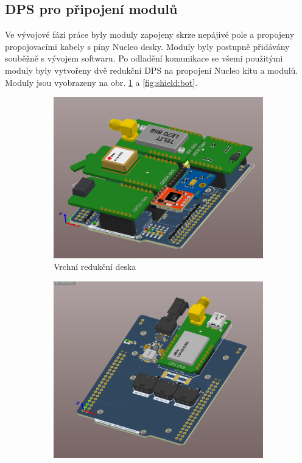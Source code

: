 \documentclass[twoside]{ctuthesis}
\theoremstyle{plain}
\theoremstyle{definition}
\theoremstyle{note}
\begin{document}
		
		\subsection{DPS pro připojení modulů}
		Ve vývojové fázi práce byly moduly zapojeny skrze nepájivé pole a propojeny propojovacími kabely s piny Nucleo desky. Moduly byly postupně přidávány souběžně s vývojem softwaru. Po odladění komunikace se všemi použitými moduly byly vytvořeny dvě redukční DPS na propojení Nucleo kitu a modulů. Moduly jsou vyobrazeny na obr. \ref{fig:shield:top} a \ref{fig:shield:bot}. 

		\begin{figure}[hbtp]
			\centering
			\begin{subfigure}{0.3\textwidth}
				\centering
				\includegraphics[height=0.7\linewidth]{Figures/shield_top.png} 
				\caption{Vrchní redukční deska}
				\label{fig:shield:top}
			\end{subfigure}%
			\begin{subfigure}{.3\textwidth}
				\centering
				\includegraphics[height=0.7\linewidth]{Figures/shield_bot.png}

\end{subfigure}
\end{figure}
\end{document}
